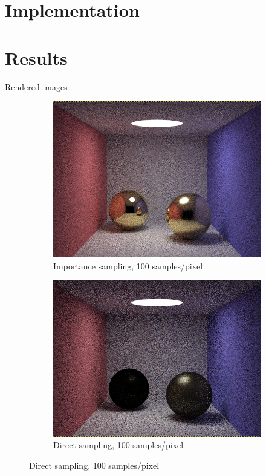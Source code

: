 \documentclass[10pt]{beamer}
\begin{document}
\section{Implementation}

\section{Results}
\begin{frame}{Rendered images}
\begin{figure}[H]
\centering
\begin{subfigure}{.5\textwidth}
  \centering
  \includegraphics[width=.9\linewidth]{IS100.png}
  \caption{Importance sampling, 100 samples/pixel}
  \label{fig:sub1}
\end{subfigure}%
\begin{subfigure}{.5\textwidth}
  \centering
  \includegraphics[width=.9\linewidth]{DS100.png}
  \caption{Direct sampling, 100 samples/pixel}
  \label{fig:sub2}
\end{subfigure}
\end{figure}
\end{frame}
\end{document}
